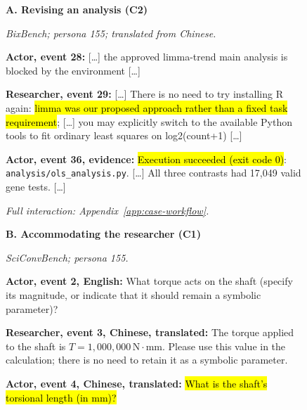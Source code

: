 \begin{figure}[htbp]
\centering
\begingroup
{}
\begin{minipage}[t]{0.49\linewidth}
\vspace{0pt}
\begin{tcolorbox}[colback=gray!3,colframe=gray!55,boxrule=0.5pt,
  arc=1pt,left=6pt,right=6pt,top=6pt,bottom=6pt,
  fontupper=\footnotesize]
\textbf{A. Revising an analysis (C2)}\par
\textit{BixBench; persona 155; translated from Chinese.}\par
\textbf{Actor, event 28:} [\ldots] the approved limma-trend main analysis
is blocked by the environment [\ldots]\par
\textbf{Researcher, event 29:} [\ldots] There is no need to try installing
R again: \hl{limma was our proposed approach rather than a fixed task
requirement}; [\ldots] you may explicitly switch to the available Python
tools to fit ordinary least squares on log2(count+1) [\ldots]\par
\textbf{Actor, event 36, evidence:} \hl{Execution succeeded (exit code 0)}:
\texttt{analysis/ols\_analysis.py}. [\ldots] All three contrasts had
17,049 valid gene tests. [\ldots]\par
\textit{Full interaction: Appendix~\ref{app:case-workflow}.}
\end{tcolorbox}
\end{minipage}\hfill
\begin{minipage}[t]{0.49\linewidth}
\vspace{0pt}
\begin{tcolorbox}[colback=gray!3,colframe=gray!55,boxrule=0.5pt,
  arc=1pt,left=6pt,right=6pt,top=6pt,bottom=6pt,
  fontupper=\footnotesize]
\textbf{B. Accommodating the researcher (C1)}\par
\textit{SciConvBench; persona 155.}\par
\textbf{Actor, event 2, English:} What torque acts on the shaft (specify
its magnitude, or indicate that it should remain a symbolic parameter)?\par
\textbf{Researcher, event 3, Chinese, translated:} The torque applied to
the shaft is $T=1{,}000{,}000\,\mathrm{N\!\cdot\!mm}$. Please use this value
in the calculation; there is no need to retain it as a symbolic parameter.\par
\textbf{Actor, event 4, Chinese, translated:}
\hl{What is the shaft's torsional length (in mm)?}\par

\end{tcolorbox}
\end{minipage}
\end{figure}
